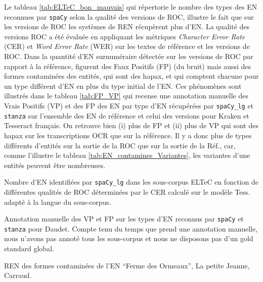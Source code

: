 Le tableau \ref{tab:ELTeC_bon_mauvais} qui répertorie le nombre des types des EN reconnues par \texttt{spaCy} selon la qualité des versions de ROC, illustre le fait que sur les versions de ROC les systèmes de REN récupèrent plus d'EN. La qualité des versions ROC a été évaluée en appliquant les métriques \textit{Character Error Rate} (CER) et \textit{Word Error Rate} (WER) sur les textes de référence et les versions de ROC.
Dans la quantité d'EN surnuméraire détectée sur les versions de ROC par rapport à la référence, figurent des Faux Positifs (FP) (du bruit) mais aussi des formes contaminées des entités, qui sont des hapax, et qui comptent chacune pour un type différent d'EN en plus du type initial de l'EN. Ces phénomènes sont illustrés dans le tableau \ref{tab:FP_VP} qui recense une annotation manuelle des Vrais Positifs (VP) et des FP des EN par type d'EN récupérées par \texttt{spaCy\_lg} et \texttt{stanza} sur l'ensemble des EN de référence et celui des versions pour Kraken et Tesseract français. On retrouve bien (i) plus de FP et (ii) plus de VP qui sont des hapax sur les transcriptions OCR que sur la référence. Il y a donc plus de types différents d'entités sur la sortie de la ROC que sur la sortie de la Réf., car, comme l'illustre le tableau \ref{tab:EN_contamines_Variantes}, les variantes d'une entités peuvent être nombreuses. 

\begin{table}[h!]
    \centering
    \small
    
    \caption{Nombre d'EN identifiées par \texttt{spaCy\_lg} dans les sous-corpus ELTeC  en fonction de différentes qualités de ROC déterminées par le CER calculé sur le modèle Tess. adapté à la langue du sous-corpus. 
    }
    \label{tab:ELTeC_bon_mauvais}
\end{table}

\begin{table}[h!]
\small
    \centering
    
    \caption{Annotation manuelle des VP et FP sur les types d'EN reconnus par \texttt{spaCy} et \texttt{stanza} pour  Daudet. Compte tenu du temps que prend une annotation manuelle, nous n'avons pas annoté tous les sous-corpus et nous ne disposons pas d'un gold standard global.}
    \label{tab:FP_VP}
\end{table}



\begin{table}[h!]
\small
    \centering
    
    \caption{REN des formes contaminées de l'EN ``Ferme des Ormeaux'', {\normalfont La petite Jeanne}, Carraud.}
    \label{tab:EN_contamines_Variantes}
\end{table}

